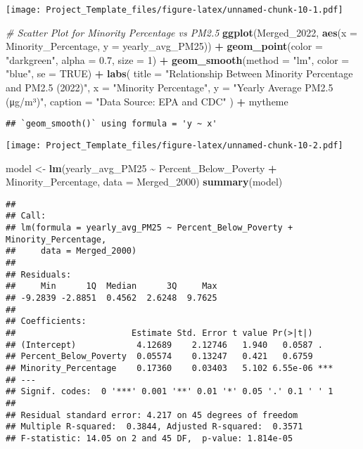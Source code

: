 \documentclass[
]{article}
\newenvironment{Shaded}{\begin{snugshade}}{\end{snugshade}}
\newcommand{\AttributeTok}[1]{\textcolor[rgb]{0.13,0.29,0.53}{#1}}
\newcommand{\CommentTok}[1]{\textcolor[rgb]{0.56,0.35,0.01}{\textit{#1}}}
\newcommand{\ConstantTok}[1]{\textcolor[rgb]{0.56,0.35,0.01}{#1}}
\newcommand{\DecValTok}[1]{\textcolor[rgb]{0.00,0.00,0.81}{#1}}
\newcommand{\FloatTok}[1]{\textcolor[rgb]{0.00,0.00,0.81}{#1}}
\newcommand{\FunctionTok}[1]{\textcolor[rgb]{0.13,0.29,0.53}{\textbf{#1}}}
\newcommand{\NormalTok}[1]{#1}
\newcommand{\OtherTok}[1]{\textcolor[rgb]{0.56,0.35,0.01}{#1}}
\newcommand{\SpecialCharTok}[1]{\textcolor[rgb]{0.81,0.36,0.00}{\textbf{#1}}}
\newcommand{\StringTok}[1]{\textcolor[rgb]{0.31,0.60,0.02}{#1}}
\begin{document}
\texttt{[image: Project\_Template\_files/figure-latex/unnamed-chunk-10-1.pdf]}

\begin{Shaded}
\begin{Highlighting}[]
\CommentTok{\# Scatter Plot for Minority Percentage vs PM2.5}
\FunctionTok{ggplot}\NormalTok{(Merged\_2022, }\FunctionTok{aes}\NormalTok{(}\AttributeTok{x =}\NormalTok{ Minority\_Percentage, }\AttributeTok{y =}\NormalTok{ yearly\_avg\_PM25)) }\SpecialCharTok{+}
  \FunctionTok{geom\_point}\NormalTok{(}\AttributeTok{color =} \StringTok{"darkgreen"}\NormalTok{, }\AttributeTok{alpha =} \FloatTok{0.7}\NormalTok{, }\AttributeTok{size =} \DecValTok{1}\NormalTok{) }\SpecialCharTok{+}
  \FunctionTok{geom\_smooth}\NormalTok{(}\AttributeTok{method =} \StringTok{"lm"}\NormalTok{, }\AttributeTok{color =} \StringTok{"blue"}\NormalTok{, }\AttributeTok{se =} \ConstantTok{TRUE}\NormalTok{) }\SpecialCharTok{+}
  \FunctionTok{labs}\NormalTok{(}
    \AttributeTok{title =} \StringTok{"Relationship Between Minority Percentage and PM2.5 (2022)"}\NormalTok{,}
    \AttributeTok{x =} \StringTok{"Minority Percentage"}\NormalTok{,}
    \AttributeTok{y =} \StringTok{"Yearly Average PM2.5 (μg/m³)"}\NormalTok{,}
    \AttributeTok{caption =} \StringTok{"Data Source: EPA and CDC"}
\NormalTok{  ) }\SpecialCharTok{+}
\NormalTok{  mytheme}
\end{Highlighting}
\end{Shaded}

\begin{verbatim}
## `geom_smooth()` using formula = 'y ~ x'
\end{verbatim}

\texttt{[image: Project\_Template\_files/figure-latex/unnamed-chunk-10-2.pdf]}

\begin{Shaded}
\begin{Highlighting}[]
\NormalTok{model }\OtherTok{\textless{}{-}} \FunctionTok{lm}\NormalTok{(yearly\_avg\_PM25 }\SpecialCharTok{\textasciitilde{}}\NormalTok{ Percent\_Below\_Poverty }\SpecialCharTok{+}\NormalTok{ Minority\_Percentage, }\AttributeTok{data =}\NormalTok{ Merged\_2000)}
\FunctionTok{summary}\NormalTok{(model)}
\end{Highlighting}
\end{Shaded}

\begin{verbatim}
## 
## Call:
## lm(formula = yearly_avg_PM25 ~ Percent_Below_Poverty + Minority_Percentage, 
##     data = Merged_2000)
## 
## Residuals:
##     Min      1Q  Median      3Q     Max 
## -9.2839 -2.8851  0.4562  2.6248  9.7625 
## 
## Coefficients:
##                       Estimate Std. Error t value Pr(>|t|)    
## (Intercept)            4.12689    2.12746   1.940   0.0587 .  
## Percent_Below_Poverty  0.05574    0.13247   0.421   0.6759    
## Minority_Percentage    0.17360    0.03403   5.102 6.55e-06 ***
## ---
## Signif. codes:  0 '***' 0.001 '**' 0.01 '*' 0.05 '.' 0.1 ' ' 1
## 
## Residual standard error: 4.217 on 45 degrees of freedom
## Multiple R-squared:  0.3844, Adjusted R-squared:  0.3571 
## F-statistic: 14.05 on 2 and 45 DF,  p-value: 1.814e-05
\end{verbatim}
\end{document}
